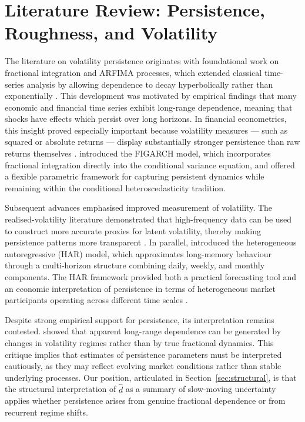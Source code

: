 \documentclass[11pt,a4paper]{article}
\newcommand{\dhat}{\hat d}
\begin{document}
\section{Literature Review: Persistence, Roughness, and Volatility}
\label{sec:literature}

The literature on volatility persistence originates with foundational work
on fractional integration and ARFIMA processes, which extended classical
time-series analysis by allowing dependence to decay hyperbolically rather
than exponentially \citep{granger1980introduction,hosking1981fractional}.
This development was motivated by empirical findings that many economic
and financial time series exhibit long-range dependence, meaning that
shocks have effects which persist over long horizons. In financial
econometrics, this insight proved especially important because volatility
measures --- such as squared or absolute returns --- display substantially
stronger persistence than raw returns themselves
\citep{ding1993long}. \citet{baillie1996fractionally} introduced the
FIGARCH model, which incorporates fractional integration directly into the
conditional variance equation, and offered a flexible parametric framework
for capturing persistent dynamics while remaining within the conditional
heteroscedasticity tradition.

Subsequent advances emphasised improved measurement of volatility. The
realised-volatility literature demonstrated that high-frequency data can
be used to construct more accurate proxies for latent volatility, thereby
making persistence patterns more transparent
\citep{andersen2003modeling,barndorff2002econometric}. In parallel,
\citet{corsi2009simple} introduced the heterogeneous autoregressive (HAR)
model, which approximates long-memory behaviour through a multi-horizon
structure combining daily, weekly, and monthly components. The HAR
framework provided both a practical forecasting tool and an economic
interpretation of persistence in terms of heterogeneous market participants
operating across different time scales \citep{muller1997volatilities}.

Despite strong empirical support for persistence, its interpretation
remains contested. \citet{mikosch2004nonstationarities} showed that
apparent long-range dependence can be generated by changes in volatility
regimes rather than by true fractional dynamics. This critique implies
that estimates of persistence parameters must be interpreted cautiously,
as they may reflect evolving market conditions rather than stable underlying
processes. Our position, articulated in
Section~\ref{sec:structural}, is that the structural interpretation of
$\dhat$ as a summary of slow-moving uncertainty applies whether persistence
arises from genuine fractional dependence or from recurrent regime shifts.
\end{document}
